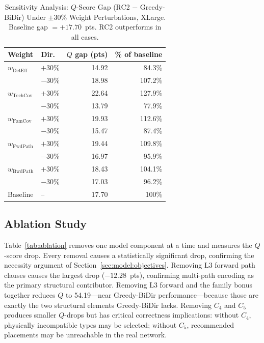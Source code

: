 \documentclass[journal]{IEEEtran}
\newcommand{\qscore}{$Q$-score}
\begin{document}
\begin{table}[t]
\caption{Sensitivity Analysis: $Q$-Score Gap (RC2 $-$ Greedy-BiDir)
  Under $\pm30\%$ Weight Perturbations, XLarge.
  Baseline gap $=+17.70$~pts. RC2 outperforms in all cases.}
\label{tab:sensitivity}
\centering
\renewcommand{\arraystretch}{1.2}
\begin{tabular}{llrr}
\toprule
Weight & Dir. & $Q$ gap (pts) & \% of baseline \\
\midrule
$w_{\mathrm{DetEff}}$  & $+30\%$ & 14.92 & 84.3\% \\
                        & $-30\%$ & 18.98 & 107.2\% \\
$w_{\mathrm{TechCov}}$ & $+30\%$ & 22.64 & 127.9\% \\
                        & $-30\%$ & 13.79 & 77.9\% \\
$w_{\mathrm{FamCov}}$  & $+30\%$ & 19.93 & 112.6\% \\
                        & $-30\%$ & 15.47 & 87.4\% \\
$w_{\mathrm{FwdPath}}$ & $+30\%$ & 19.44 & 109.8\% \\
                        & $-30\%$ & 16.97 & 95.9\% \\
$w_{\mathrm{BwdPath}}$ & $+30\%$ & 18.43 & 104.1\% \\
                        & $-30\%$ & 17.03 & 96.2\% \\
\midrule
Baseline & -- & 17.70 & 100\% \\
\bottomrule
\end{tabular}
\end{table}

\subsection{Ablation Study}
\label{sec:results:ablation}

Table~\ref{tab:ablation} removes one model component at a time and
measures the \qscore{} drop. Every removal causes a statistically
significant drop, confirming the necessity argument of
Section~\ref{sec:model:objectives}. Removing L3 forward path clauses
causes the largest drop ($-12.28$~pts), confirming multi-path
encoding as the primary structural contributor. Removing L3 forward
and the family bonus together reduces $Q$ to 54.19---near
Greedy-BiDir performance---because those are exactly the two
structural elements Greedy-BiDir lacks. Removing $C_4$ and $C_5$
produces smaller $Q$-drops but has critical correctness implications:
without $C_4$, physically incompatible types may be selected;
without $C_5$, recommended placements may be unreachable in the
real network.
\end{document}
